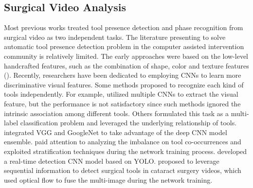 \documentclass{elsarticle}
\begin{document}
\subsection{Surgical Video Analysis}
Most previous works treated tool presence detection and phase recognition from surgical video as two independent tasks.
The literature presenting to solve automatic tool presence detection problem in the computer assisted intervention community is relatively limited.
The early approaches were based on the low-level handcrafted features, such as the combination of shape, color and texture features (\cite{lalys2012framework}).
Recently, researchers have been dedicated to employing CNNs to learn more discriminative visual features.
Some methods proposed to recognize each kind of tools independently. 
For example, \cite{luosurgical} utilized multiple CNNs to extract the visual feature, but the performance is not satisfactory since such methods ignored the intrinsic association among different tools.
Others formulated this task as a multi-label classification problem and leveraged the underlying relationship of tools. 
\cite{wang2017deep} integrated VGG and GoogleNet to take advantage of the deep CNN model ensemble.
\cite{sahu2017addressing} paid attention to analyzing the imbalance on tool co-occurrences and exploited stratification techniques during the network training process.
\cite{choi2017surgical} developed a real-time detection CNN model based on YOLO. 
\cite{al2017surgical} proposed to leverage sequential information to detect surgical tools in cataract surgery videos, which used optical flow to fuse the multi-image during the network training.
\end{document}
